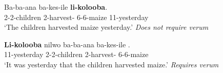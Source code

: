 \documentclass[output=paper]{langscibook}
\begin{document}
\ea \label{ex:sikuku:InSituExSituAnswers}
\begin{xlist}

\ex \label{ex:sikuku:InSituAnswer}
\gll Ba-ba-ana ba-kes-ile  \textbf{li-kolooba}. \\
2-2-children 2\Om-harvest-\Pfv{} 6-6-maize 11-yesterday \\
\glt `The children harvested maize yesterday.' \textit{Does not require verum}

\ex \label{ex:sikuku:ExSituAnswer}
\gll \textbf{Li-kolooba} nilwo ba-ba-ana ba-kes-ile .  \\
11-yesterday  2-2-children 2\Om-harvest-\Prf{} 6-6-maize \\
\glt `It was yesterday that the children harvested maize.' \textit{Requires verum}

\end{xlist}
\z






\end{document}
